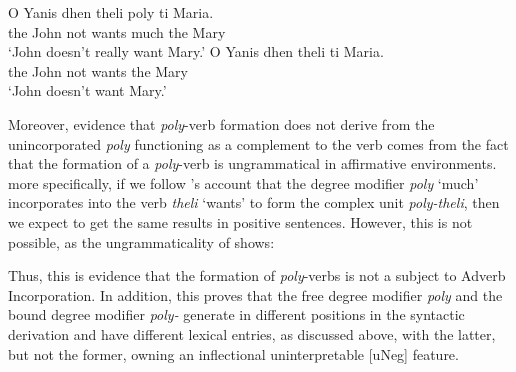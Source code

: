 \documentclass[output=paper]{langscibook}
\begin{document}
\begin{exe}
\ex\label{gia:ex31} \begin{xlist}
        \ex\label{gia:ex31a} \gll O Yanis dhen theli poly ti Maria. \\
        the John not wants much the Mary \\
        \trans `John doesn't really want Mary.'
        \ex\label{gia:ex31b} \gll O Yanis dhen theli ti Maria. \\
        the John not wants the Mary \\
        \trans `John doesn't want Mary.'
    \end{xlist}
\end{exe}

\noindent Moreover, evidence that \textit{poly}-verb formation does not derive from the unincorporated \textit{poly} functioning as a complement to the verb comes from the fact that the formation of a \textit{poly}-verb is ungrammatical in affirmative environments. more specifically, if we follow \citeauthor{rivero1992}'s account that the degree modifier \textit{poly} ‘much’ incorporates into the verb \textit{theli} ‘wants’ to form the complex unit \textit{poly-theli}, then we expect to get the same results in positive sentences. However, this is not possible, as the ungrammaticality of  shows:

\begin{exe}
\ex\label{gia:ex32} \begin{xlist}
        \label{gia:ex32b}
    \end{xlist}
\end{exe}

\noindent Thus, this is evidence that the formation of \textit{poly}-verbs is not a subject to Adverb Incorporation. In addition, this proves that the free degree modifier \textit{poly} and the bound degree modifier \textit{poly-} generate in different positions in the syntactic derivation and have different lexical entries, as discussed above, with the latter, but not the former, owning an inflectional uninterpretable [uNeg] feature.
\end{document}
